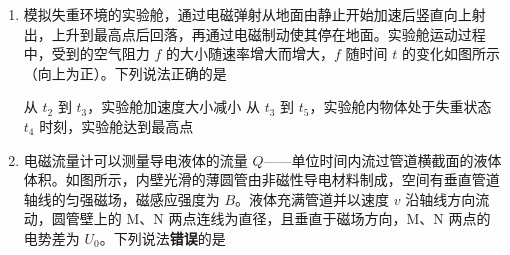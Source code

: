 \documentclass[\gkver]{gaokaozhenti}
\begin{document}
\begin{enumerate}
{C．磁铁离线圈最近时，此时磁铁与线圈的相对速度为零，感应电动势为零，感应电流为零，线圈受到的安培力为零，故 C 错误；

D．分析可知有无线圈时，根据平衡条件最后磁铁静止后弹簧的伸长量相同，由于磁铁和弹簧组成的系统损失的机械能为磁铁减小的重力势能减去此时弹簧的弹性势能，故系统损失的机械能相同，故 D 正确。

故选 D。
}

\item
模拟失重环境的实验舱，通过电磁弹射从地面由静止开始加速后竖直向上射出，上升到最高点后回落，再通过电磁制动使其停在地面。实验舱运动过程中，受到的空气阻力 $f$ 的大小随速率增大而增大，$f$ 随时间 $t$ 的变化如图所示（向上为正）。下列说法正确的是

\onepicture[w=6.20cm, h=3.76cm]{}

{从 $t_{2}$ 到 $t_{3}$，实验舱加速度大小减小}
{从 $t_{3}$ 到 $t_{5}$，实验舱内物体处于失重状态}
{$t_{4}$ 时刻，实验舱达到最高点}


\item
电磁流量计可以测量导电液体的流量 $Q$——单位时间内流过管道横截面的液体体积。如图所示，内壁光滑的薄圆管由非磁性导电材料制成，空间有垂直管道轴线的匀强磁场，磁感应强度为 $B$。液体充满管道并以速度 $v$ 沿轴线方向流动，圆管壁上的 M、N 两点连线为直径，且垂直于磁场方向，M、N 两点的电势差为 $U_{0}$。下列说法\textbf{错误}的是


\end{enumerate}
\end{document}
